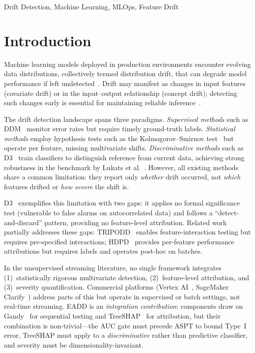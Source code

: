 \documentclass[conference,a4paper]{IEEEtran}
\begin{document}
\begin{IEEEkeywords}
Drift Detection, Machine Learning, MLOps, Feature Drift
\end{IEEEkeywords}

\section{Introduction}

Machine learning models deployed in production environments encounter evolving data distributions, collectively termed distribution drift, that can degrade model performance if left undetected~\cite{b1,b2}. Drift may manifest as changes in input features (covariate drift) or in the input--output relationship (concept drift); detecting such changes early is essential for maintaining reliable inference~\cite{b3,b4}.

The drift detection landscape spans three paradigms. \textit{Supervised methods} such as DDM~\cite{b8} monitor error rates but require timely ground-truth labels. \textit{Statistical methods} employ hypothesis tests such as the Kolmogorov--Smirnov test~\cite{b6,b7} but operate per feature, missing multivariate shifts. \textit{Discriminative methods} such as D3~\cite{b9} train classifiers to distinguish reference from current data, achieving strong robustness in the benchmark by Lukats et al.~\cite{b10}. However, all existing methods share a common limitation: they report only \textit{whether} drift occurred, not \textit{which} features drifted or \textit{how severe} the shift is.

D3~\cite{b9} exemplifies this limitation with two gaps: it applies no formal significance test (vulnerable to false alarms on autocorrelated data) and follows a ``detect-and-discard'' pattern, providing no feature-level attribution. Related work partially addresses these gaps: TRIPODD~\cite{b28} enables feature-interaction testing but requires pre-specified interactions; HDPD~\cite{b29} provides per-feature performance attributions but requires labels and operates post-hoc on batches.

In the unsupervised streaming literature, no single framework integrates (1)~statistically rigorous multivariate detection, (2)~feature-level attribution, and (3)~severity quantification. Commercial platforms (Vertex AI~\cite{b20}, SageMaker Clarify~\cite{b21}) address parts of this but operate in supervised or batch settings, not real-time streaming. EADD is an \textit{integration contribution}: components draw on Gandy~\cite{b30} for sequential testing and TreeSHAP~\cite{b24,b31} for attribution, but their combination is non-trivial---the AUC gate must precede ASPT to bound Type~I error, TreeSHAP must apply to a \textit{discriminative} rather than predictive classifier, and severity must be dimensionality-invariant.
\end{document}
